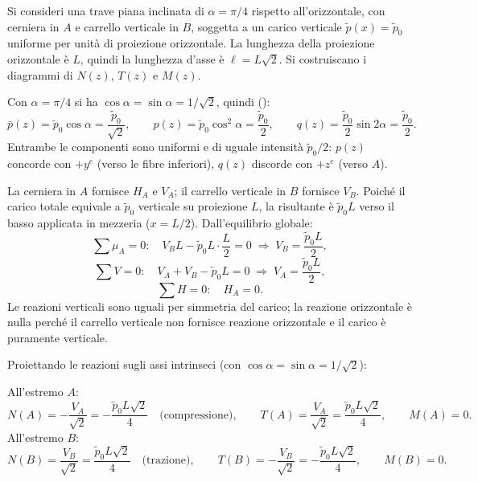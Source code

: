 \begin{esempio}
	Si consideri una trave piana inclinata di
	$\alpha = \pi/4$ rispetto all'orizzontale,
	con cerniera in $A$ e carrello verticale in
	$B$, soggetta a un carico verticale
	$\tilde{p}(x) = \tilde{p}_0$ uniforme per unità
	di proiezione orizzontale. La lunghezza della
	proiezione orizzontale è $L$, quindi la
	lunghezza d'asse è $\ell = L\sqrt{2}$.
	Si costruiscano i diagrammi di $N(z)$,
	$T(z)$ e $M(z)$.
	
	\begin{svolgimento}
		
		
		
		Con $\alpha = \pi/4$ si ha $\cos\alpha =
		\sin\alpha = 1/\sqrt{2}$, quindi
		():
		\[
		\bar{p}(z) = \tilde{p}_0\cos\alpha
		= \frac{\tilde{p}_0}{\sqrt{2}},
		\qquad
		p(z) = \tilde{p}_0\cos^2\alpha = \frac{\tilde{p}_0}{2},
		\qquad
		q(z) = \frac{\tilde{p}_0}{2}\sin 2\alpha
		= \frac{\tilde{p}_0}{2}.
		\]
		Entrambe le componenti sono uniformi e di
		uguale intensità $\tilde{p}_0/2$: $p(z)$ concorde
		con $+y^e$ (verso le fibre inferiori), $q(z)$
		discorde con $+z^e$ (verso $A$).
		
		La cerniera in $A$ fornisce $H_A$ e $V_A$;
		il carrello verticale in $B$ fornisce $V_B$.
		Poiché il carico totale equivale a $\tilde{p}_0$
		verticale su proiezione $L$, la risultante
		è $\tilde{p}_0L$ verso il basso applicata in
		mezzeria ($x = L/2$).
		Dall'equilibrio globale:
		\[
		\sum \mu_A = 0:\quad
		V_B L - \tilde{p}_0L\cdot\frac{L}{2} = 0
		\;\Rightarrow\;
		V_B = \frac{\tilde{p}_0L}{2},
		\]
		\[
		\sum V = 0:\quad
		V_A + V_B - \tilde{p}_0L = 0
		\;\Rightarrow\;
		V_A = \frac{\tilde{p}_0L}{2},
		\]
		\[
		\sum H = 0:\quad
		H_A = 0.
		\]
		Le reazioni verticali sono uguali per
		simmetria del carico; la reazione orizzontale
		è nulla perché il carrello verticale non
		fornisce reazione orizzontale e il carico
		è puramente verticale.
		
		Proiettando le reazioni sugli assi intrinseci
		(con $\cos\alpha = \sin\alpha = 1/\sqrt{2}$):
		
		All'estremo $A$:
		\[
		N(A) = -\frac{V_A}{\sqrt{2}}
		= -\frac{\tilde{p}_0L\sqrt{2}}{4}
		\quad\text{(compressione)},
		\qquad
		T(A) = \frac{V_A}{\sqrt{2}}
		= \frac{\tilde{p}_0L\sqrt{2}}{4},
		\qquad
		M(A) = 0.
		\]
		All'estremo $B$:
		\[
		N(B) = \frac{V_B}{\sqrt{2}}
		= \frac{\tilde{p}_0L\sqrt{2}}{4}
		\quad\text{(trazione)},
		\qquad
		T(B) = -\frac{V_B}{\sqrt{2}}
		= -\frac{\tilde{p}_0L\sqrt{2}}{4},
		\qquad
		M(B) = 0.
		\]
		


\end{svolgimento}
\end{esempio}
